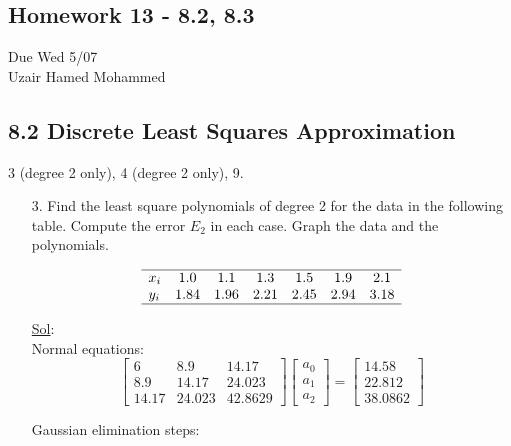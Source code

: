 \begin{center}
  \section*{Homework 13 - 8.2, 8.3}
  Due Wed 5/07 \\
  Uzair Hamed Mohammed
\end{center}

\subsection*{8.2 Discrete Least Squares Approximation}

3 (degree 2 only), 4 (degree 2 only), 9.

\begin{enumerate}
  \item[3.] Find the least square polynomials of degree 2 for the
    data in the following table. Compute the error \(E_2\) in each
    case. Graph the data and the polynomials.

    \[
      \begin{array}{lcccccc}
        \hline
        x_i & 1.0 & 1.1 & 1.3 & 1.5 & 1.9 & 2.1 \\
        y_i & 1.84 & 1.96 & 2.21 & 2.45 & 2.94 & 3.18 \\
        \hline
      \end{array}
    \]

    \underline{Sol}:\\

    Normal equations:
    \[
      \begin{bmatrix}
        6 & 8.9 & 14.17 \\
        8.9 & 14.17 & 24.023 \\
        14.17 & 24.023 & 42.8629
      \end{bmatrix}
      \begin{bmatrix}
        a_0 \\ a_1 \\ a_2
      \end{bmatrix}
      =
      \begin{bmatrix}
        14.58 \\ 22.812 \\ 38.0862
      \end{bmatrix}
    \]

    Gaussian elimination steps:


\end{enumerate}
